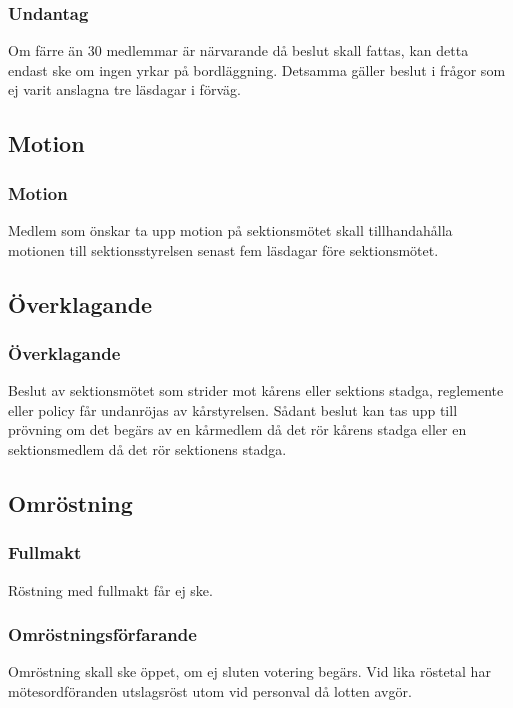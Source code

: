 \subsubsection{Undantag}
Om färre än 30 medlemmar är närvarande då beslut skall fattas, kan detta endast ske om ingen yrkar på bordläggning. Detsamma gäller beslut i frågor som ej varit anslagna tre läsdagar i förväg.

\subsection{Motion}

\subsubsection{Motion}
Medlem som önskar ta upp motion på sektionsmötet skall tillhandahålla motionen till sektionsstyrelsen senast fem läsdagar före sektionsmötet.

\subsection{Överklagande}

\subsubsection{Överklagande}
Beslut av sektionsmötet som strider mot kårens eller sektions stadga, reglemente eller policy får undanröjas av kårstyrelsen. Sådant beslut kan tas upp till prövning om det begärs av en kårmedlem då det rör kårens stadga eller en sektionsmedlem då det rör sektionens stadga.

\subsection{Omröstning}

\subsubsection{Fullmakt}
Röstning med fullmakt får ej ske.

\subsubsection{Omröstningsförfarande}
Omröstning skall ske öppet, om ej sluten votering begärs. Vid lika röstetal har mötesordföranden utslagsröst utom vid personval då lotten avgör.

